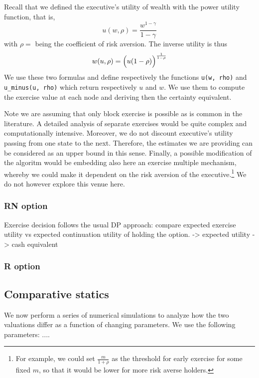 Recall that we defined the executive's utility of wealth with the power utility function, that is, 
$$u(w, \rho) = \frac{w^{1-\gamma}}{1-\gamma}$$
with $\rho = $ being the coefficient of risk aversion. 
The inverse utility is thus $$w(u, \rho) = \Bigl(u(1-\rho)\Bigr)^{\frac{1}{1-\rho}}$$
We use these two formulas and define respectively the functions \verb|u(w, rho)| and \verb|u_minus(u, rho)| which return respectively $u$ and $w$. We use them to compute the exercise value at each node and deriving then the certainty equivalent.


Note we are assuming that only block exercise is possible as is common in the literature. A detailed analysis of separate exercises would be quite complex and computationally intensive. Moreover, we do not discount executive's utility passing from one state to the next. Therefore, the estimates we are providing can be considered as an upper bound in this sense.
Finally, a possible modification of the algoritm would be embedding also here an exercise multiple mechanism, whereby we could make it dependent on the risk aversion of the executive.\footnote{For example, we could set $\frac{m}{1+\rho}$ as the threshold for early exercise for some fixed $m$, so that it would be lower for more risk averse holders.} We do not however explore this venue here.


\subsubsection*{RN option}
Exercise decision follows the usual DP approach: compare expected exercise utility vs expected continuation utility of holding the option.
-> expected utility -> cash equivalent

\subsubsection*{R option}







\subsection{Comparative statics}
We now perform a series of numerical simulations to analyze how the two valuations differ as a function of changing parameters.
We use the following parameters: ....

